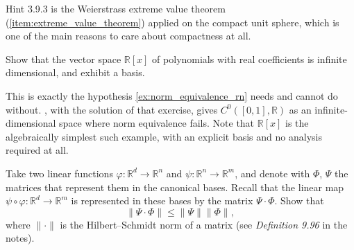 \begin{remark}
Hint 3.9.3 is the Weierstrass extreme value theorem
(\cref{item:extreme_value_theorem}) applied on the compact unit sphere, which is one of the main
reasons to care about compactness at all.
\end{remark}

\begin{exercise}
\label{ex:polynomials_infinite_dimensional}
Show that the vector space $\mathbb{R}[x]$ of polynomials with real coefficients is infinite
dimensional, and exhibit a basis.
\end{exercise}

\begin{remark}
This is exactly the hypothesis \cref{ex:norm_equivalence_rn} needs and cannot do without.
, with the solution of that exercise, gives
$C^0([0,1],\mathbb{R})$ as an infinite-dimensional space where norm equivalence fails. Note that $\mathbb{R}[x]$ is the
algebraically simplest such example, with an explicit basis and no analysis required at all.
\end{remark}


\begin{exercise}
\label{ex:hilbert_schmidt_submultiplicative}
Take two linear functions $\varphi : \mathbb{R}^d \to \mathbb{R}^n$ and
$\psi : \mathbb{R}^n \to \mathbb{R}^m$, and denote with $\Phi$, $\Psi$ the matrices that represent
them in the canonical bases. Recall that the linear map
$\psi \circ \varphi : \mathbb{R}^d \to \mathbb{R}^m$ is represented in these bases by the matrix
$\Psi \cdot \Phi$. Show that
$$\|\Psi \cdot \Phi\| \leq \|\Psi\|\|\Phi\|,$$
where $\|\cdot\|$ is the Hilbert--Schmidt norm of a matrix (see \textit{Definition 9.96} in the
notes).

\end{exercise}

